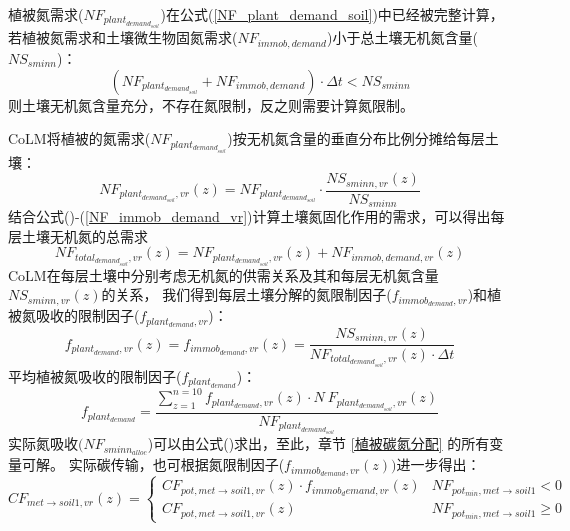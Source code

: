植被氮需求($NF_{plant_{demand_{soil}}}$)在公式(\ref{NF_plant_demand_soil})中已经被完整计算，若植被氮需求和土壤微生物固氮需求($NF_{immob,demand}$)小于总土壤无机氮含量(${NS}_{sminn}$)：
\begin{equation}
    \left(NF_{plant_{demand_{soil}}}+NF_{immob,demand}\right)\cdot\Delta t<NS_{sminn}
\end{equation}
则土壤无机氮含量充分，不存在氮限制，反之则需要计算氮限制。

CoLM将植被的氮需求($NF_{plant_{demand_{soil}}}$)按无机氮含量的垂直分布比例分摊给每层土壤：
\begin{equation}
    NF_{plant_{demand_{soil}},vr}\left(z\right)=NF_{plant_{demand_{soil}}}\cdot\frac{NS_{sminn,vr}\left(z\right)}{NS_{sminn}}
\end{equation}
结合公式(\label{NF_pot_minmet})-(\ref{NF_immob_demand_vr})计算土壤氮固化作用的需求，可以得出每层土壤无机氮的总需求
\begin{equation}
    NF_{total_{demand_{soil}},vr}\left(z\right)=NF_{plant_{demand_{soil}},vr}\left(z\right)+NF_{immob,demand,vr}\left(z\right)
\end{equation}
CoLM在每层土壤中分别考虑无机氮的供需关系及其和每层无机氮含量${NS}_{sminn,vr}\left(z\right)$的关系，
我们得到每层土壤分解的氮限制因子($f_{immob_{demand},vr}$)和植被氮吸收的限制因子($f_{plant_{demand},vr}$)：
\begin{equation}
    f_{plant_{demand},vr}\left(z\right)=f_{immob_{demand},vr}\left(z\right)=\frac{NS_{sminn,vr}\left(z\right)}{NF_{total_{demand_{soil}},vr}\left(z\right)\cdot\Delta t}
\end{equation}
平均植被氮吸收的限制因子($f_{plant_{demand}}$)：
\begin{equation}
    f_{plant_{demand}}=\frac{\sum_{z=1}^{n=10}{f_{plant_{demand},vr}\left(z\right)\cdot N\ F_{plant_{demand_{soil}},vr}\left(z\right)}}{NF_{plant_{demand_{soil}}}}
\end{equation}
实际氮吸收$(NF_{sminn_{alloc}}$)可以由公式(\label{NF_sminn_alloc})求出，至此，章节 \ref{植被碳氮分配} 的所有变量可解。
实际碳传输，也可根据氮限制因子($f_{immob_{demand},vr}\left(z\right))$进一步得出：
\begin{equation}
C F_{met \rightarrow { soil1,vr }}(z)=\left\{\begin{array}{ll}C F_{pot, met \rightarrow soil1, vr}(z) \cdot f_{{immob }_{d} { emand }, vr}(z) & N F_{pot_{m in }, { met } \rightarrow { soil } 1}<0 \\ C F_{pot, met \rightarrow { soil1,vr }}(z) & N F_{pot_{m in }, { met } \rightarrow { soil } 1} \geq 0\end{array}\right.
\end{equation}
